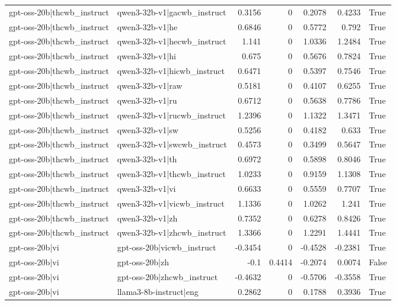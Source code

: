 \begin{table}
\begin{tabular}{l l r r r r l}
gpt-oss-20b|thcwb_instruct & qwen3-32b-v1|gacwb_instruct & 0.3156 & 0 & 0.2078 & 0.4233 & True \\
gpt-oss-20b|thcwb_instruct & qwen3-32b-v1|he & 0.6846 & 0 & 0.5772 & 0.792 & True \\
gpt-oss-20b|thcwb_instruct & qwen3-32b-v1|hecwb_instruct & 1.141 & 0 & 1.0336 & 1.2484 & True \\
gpt-oss-20b|thcwb_instruct & qwen3-32b-v1|hi & 0.675 & 0 & 0.5676 & 0.7824 & True \\
gpt-oss-20b|thcwb_instruct & qwen3-32b-v1|hicwb_instruct & 0.6471 & 0 & 0.5397 & 0.7546 & True \\
gpt-oss-20b|thcwb_instruct & qwen3-32b-v1|raw & 0.5181 & 0 & 0.4107 & 0.6255 & True \\
gpt-oss-20b|thcwb_instruct & qwen3-32b-v1|ru & 0.6712 & 0 & 0.5638 & 0.7786 & True \\
gpt-oss-20b|thcwb_instruct & qwen3-32b-v1|rucwb_instruct & 1.2396 & 0 & 1.1322 & 1.3471 & True \\
gpt-oss-20b|thcwb_instruct & qwen3-32b-v1|sw & 0.5256 & 0 & 0.4182 & 0.633 & True \\
gpt-oss-20b|thcwb_instruct & qwen3-32b-v1|swcwb_instruct & 0.4573 & 0 & 0.3499 & 0.5647 & True \\
gpt-oss-20b|thcwb_instruct & qwen3-32b-v1|th & 0.6972 & 0 & 0.5898 & 0.8046 & True \\
gpt-oss-20b|thcwb_instruct & qwen3-32b-v1|thcwb_instruct & 1.0233 & 0 & 0.9159 & 1.1308 & True \\
gpt-oss-20b|thcwb_instruct & qwen3-32b-v1|vi & 0.6633 & 0 & 0.5559 & 0.7707 & True \\
gpt-oss-20b|thcwb_instruct & qwen3-32b-v1|vicwb_instruct & 1.1336 & 0 & 1.0262 & 1.241 & True \\
gpt-oss-20b|thcwb_instruct & qwen3-32b-v1|zh & 0.7352 & 0 & 0.6278 & 0.8426 & True \\
gpt-oss-20b|thcwb_instruct & qwen3-32b-v1|zhcwb_instruct & 1.3366 & 0 & 1.2291 & 1.4441 & True \\
gpt-oss-20b|vi & gpt-oss-20b|vicwb_instruct & -0.3454 & 0 & -0.4528 & -0.2381 & True \\
gpt-oss-20b|vi & gpt-oss-20b|zh & -0.1 & 0.4414 & -0.2074 & 0.0074 & False \\
gpt-oss-20b|vi & gpt-oss-20b|zhcwb_instruct & -0.4632 & 0 & -0.5706 & -0.3558 & True \\
gpt-oss-20b|vi & llama3-8b-instruct|eng & 0.2862 & 0 & 0.1788 & 0.3936 & True \\

\end{tabular}
\end{table}
